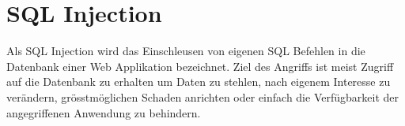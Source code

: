 \section{SQL Injection}
Als SQL Injection wird das Einschleusen von eigenen SQL Befehlen in die Datenbank einer Web Applikation bezeichnet. Ziel des Angriffs ist meist Zugriff auf die Datenbank zu erhalten um Daten zu stehlen, nach eigenem Interesse zu ver\"andern, gr\"o{ss}tm\"oglichen Schaden anrichten oder einfach die Verf\"ugbarkeit der angegriffenen Anwendung zu behindern. \cite{hackingWebAppsBuch}